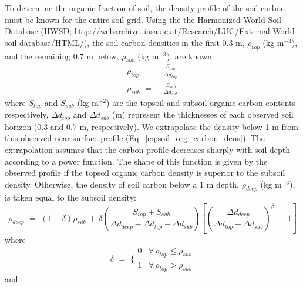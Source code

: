 To determine the organic fraction of soil, the density profile of the
soil carbon must be known for the entire soil grid. Using the the
Harmonized World Soil Database (HWSD;
http://webarchive.iiasa.ac.at/Research/LUC/External-World-soil-database/HTML/),
the soil carbon densities in the first 0.3 m, $\rho_{top}$ (kg m$^{-3}$), and the
remaining 0.7 m below, $\rho_{sub}$ (kg m$^{-3}$), are known:
%
\begin{subequations}
\label{eq:soil_org_carbon_dens}
\begin{align}
%
\rho_{top} \,\,=&\,\, \frac{S_{top}}{\Delta d_{top}}
\\
\rho_{sub} \,\,=&\,\, \frac{S_{sub}}{\Delta d_{sub}}
%
\end{align}
\end{subequations}
%
where $S_{top}$ and $S_{sub}$ (kg m$^{-2}$) are the topsoil and subsoil organic
carbon contents respectively, $\Delta d_{top}$ and $\Delta d_{sub}$
(m) represent the thicknesses of
each observed soil horizon (0.3 and 0.7 m, respectively). We extrapolate
the density below 1 m from this observed near-surface profile
(Eq.~\ref{eq:soil_org_carbon_dens}). 
The extrapolation assumes that the carbon profile
decreases sharply with soil depth according to a power function. The
shape of this function is given by the observed profile if the topsoil
organic carbon density is superior to the subsoil density. Otherwise,
the density of soil carbon below a 1 m depth, $\rho_{deep}$ (kg
m$^{-3}$), 
is taken equal to the subsoil density:
%
\begin{equation}
\label{eq:rho_deep_soil_carbon}
%
\rho_{deep} \,\, = \,\,
\left(1-\delta\right) \rho_{sub} 
\,+\,
\delta
\left(
\frac
{S_{top} + S_{sub}}
{\Delta d_{deep} - \Delta d_{top} - \Delta d_{sub} }
\right)
\left[
{\left(
\frac
{\Delta d_{deep}}
{\Delta d_{top} + \Delta d_{sub}}
\right)}^\beta \,-\, 1
\right]
%
\end{equation}
%
where
%
\begin{equation}
\delta \,\, =\,\,\Bigg\lbrace
\begin{matrix}
0 & \forall \, \rho_{top} \leq \rho_{sub}
\\
1 & \forall \, \rho_{top} > \rho_{sub}
%
\end{matrix}
\end{equation}
%
and
%
